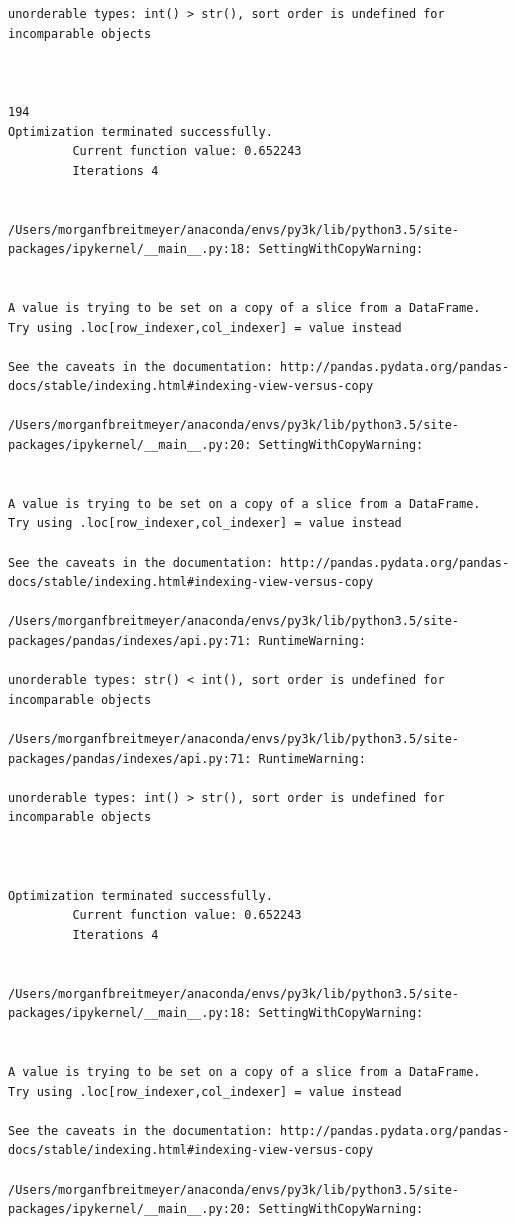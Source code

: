 \begin{lstlisting}
unorderable types: int() > str(), sort order is undefined for incomparable objects



194
Optimization terminated successfully.
         Current function value: 0.652243
         Iterations 4


/Users/morganfbreitmeyer/anaconda/envs/py3k/lib/python3.5/site-packages/ipykernel/__main__.py:18: SettingWithCopyWarning:


A value is trying to be set on a copy of a slice from a DataFrame.
Try using .loc[row_indexer,col_indexer] = value instead

See the caveats in the documentation: http://pandas.pydata.org/pandas-docs/stable/indexing.html#indexing-view-versus-copy

/Users/morganfbreitmeyer/anaconda/envs/py3k/lib/python3.5/site-packages/ipykernel/__main__.py:20: SettingWithCopyWarning:


A value is trying to be set on a copy of a slice from a DataFrame.
Try using .loc[row_indexer,col_indexer] = value instead

See the caveats in the documentation: http://pandas.pydata.org/pandas-docs/stable/indexing.html#indexing-view-versus-copy

/Users/morganfbreitmeyer/anaconda/envs/py3k/lib/python3.5/site-packages/pandas/indexes/api.py:71: RuntimeWarning:

unorderable types: str() < int(), sort order is undefined for incomparable objects

/Users/morganfbreitmeyer/anaconda/envs/py3k/lib/python3.5/site-packages/pandas/indexes/api.py:71: RuntimeWarning:

unorderable types: int() > str(), sort order is undefined for incomparable objects



Optimization terminated successfully.
         Current function value: 0.652243
         Iterations 4


/Users/morganfbreitmeyer/anaconda/envs/py3k/lib/python3.5/site-packages/ipykernel/__main__.py:18: SettingWithCopyWarning:


A value is trying to be set on a copy of a slice from a DataFrame.
Try using .loc[row_indexer,col_indexer] = value instead

See the caveats in the documentation: http://pandas.pydata.org/pandas-docs/stable/indexing.html#indexing-view-versus-copy

/Users/morganfbreitmeyer/anaconda/envs/py3k/lib/python3.5/site-packages/ipykernel/__main__.py:20: SettingWithCopyWarning:



\end{lstlisting}
